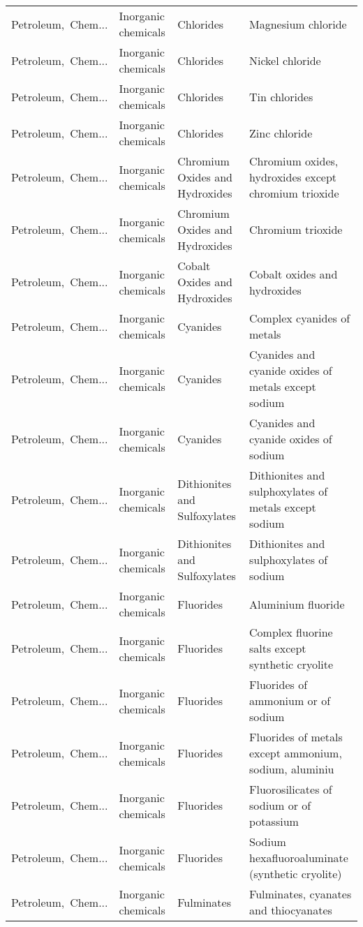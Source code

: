 \begin{appendices}
\begin{xltabular}{\textwidth}{|p{0.10\textwidth}|p{0.25\textwidth}|p{0.24\textwidth}|p{0.31\textwidth}|}
Petroleum,\ Chem... & Inorganic chemicals & Chlorides & Magnesium chloride \\
Petroleum,\ Chem... & Inorganic chemicals & Chlorides & Nickel chloride \\
Petroleum,\ Chem... & Inorganic chemicals & Chlorides & Tin chlorides \\
Petroleum,\ Chem... & Inorganic chemicals & Chlorides & Zinc chloride \\
Petroleum,\ Chem... & Inorganic chemicals & Chromium Oxides and Hydroxides & Chromium oxides, hydroxides except chromium trioxide \\
Petroleum,\ Chem... & Inorganic chemicals & Chromium Oxides and Hydroxides & Chromium trioxide \\
Petroleum,\ Chem... & Inorganic chemicals & Cobalt Oxides and Hydroxides & Cobalt oxides and hydroxides \\
Petroleum,\ Chem... & Inorganic chemicals & Cyanides & Complex cyanides of metals \\
Petroleum,\ Chem... & Inorganic chemicals & Cyanides & Cyanides and cyanide oxides of metals except sodium \\
Petroleum,\ Chem... & Inorganic chemicals & Cyanides & Cyanides and cyanide oxides of sodium \\
Petroleum,\ Chem... & Inorganic chemicals & Dithionites and Sulfoxylates & Dithionites and sulphoxylates of metals except sodium \\
Petroleum,\ Chem... & Inorganic chemicals & Dithionites and Sulfoxylates & Dithionites and sulphoxylates of sodium \\
Petroleum,\ Chem... & Inorganic chemicals & Fluorides & Aluminium fluoride \\
Petroleum,\ Chem... & Inorganic chemicals & Fluorides & Complex fluorine salts except synthetic cryolite \\
Petroleum,\ Chem... & Inorganic chemicals & Fluorides & Fluorides of ammonium or of sodium \\
Petroleum,\ Chem... & Inorganic chemicals & Fluorides & Fluorides of metals except ammonium, sodium, aluminiu \\
Petroleum,\ Chem... & Inorganic chemicals & Fluorides & Fluorosilicates of sodium or of potassium \\
Petroleum,\ Chem... & Inorganic chemicals & Fluorides & Sodium hexafluoroaluminate (synthetic cryolite) \\
Petroleum,\ Chem... & Inorganic chemicals & Fulminates & Fulminates, cyanates and thiocyanates \\

\end{xltabular}
\end{appendices}
